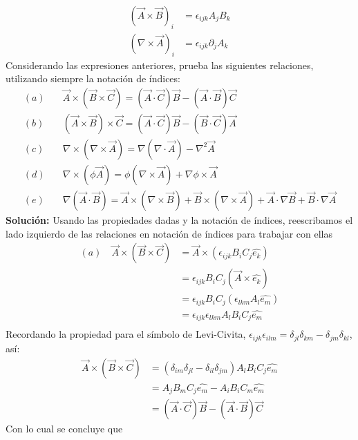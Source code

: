 \documentclass[11pt,letterpaper]{article}
\begin{document}
\begin{align}
    (\vec{A}\times\vec{B})_i &  =\epsilon_{ijk}A_jB_k \\ 
    (\nabla \times \vec{A})_i & = \epsilon_{ijk}\partial_jA_k
\end{align}
Considerando las expresiones anteriores, prueba las siguientes relaciones, utilizando siempre la notación de índices:
\begin{align}
    (a)  &\quad \vec{A}\times (\vec{B}\times\vec{C})  = (\vec{A}\cdot \vec{C}) \vec{B} - (\vec{A}\cdot\vec{B})\vec{C} \\
    (b) &\quad (\vec{A}\times\vec{B}) \times \vec{C}  = (\vec{A}\cdot \vec{C})\vec{B} - (\vec{B}\cdot\vec{C}) \vec{A} \\
    (c) &\quad \nabla \times (\nabla \times \vec{A})  = \nabla (\nabla \cdot \vec{A}) - \nabla^2 \vec{A} \\
    (d) &\quad \nabla \times (\phi\vec{A})  = \phi (\nabla \times \vec{A}) + \nabla \phi \times \vec{A} \\
    (e) &\quad \nabla (\vec{A}\cdot\vec{B})   = \vec{A}\times(\nabla\times\vec{B}) + \vec{B} \times (\nabla \times\vec{A}) + \vec{A}\cdot\nabla\vec{B} + \vec{B} \cdot\nabla\vec{A}
\end{align}
\textbf{Solución:} Usando las propiedades dadas y la notación de índices, reescribamos el lado izquierdo de las relaciones en notación de índices para trabajar con ellas
\begin{align*}
    (a)  \quad \vec{A}\times (\vec{B}\times\vec{C})   & = \vec{A}\times (\epsilon_{ijk}B_iC_j \hat{e_k}) \\
    & = \epsilon_{ijk}B_iC_j (\vec{A}\times \hat{e_k}) \\
    & = \epsilon_{ijk}B_iC_j (\epsilon_{lkm} A_l \hat{e_m}) \\
    & = \epsilon_{ijk}\epsilon_{lkm} A_lB_iC_j\hat{e_m} \\
\end{align*}
Recordando la propiedad para el símbolo de Levi-Civita, $\epsilon_{ijk}\epsilon_{ilm} = \delta_{jl}\delta_{km}-\delta_{jm} \delta_{kl}$, así:
\begin{align*}
    \vec{A}\times (\vec{B}\times\vec{C})   & = (\delta_{im}\delta_{jl} - \delta_{il}\delta_{jm}) A_lB_iC_j\hat{e_m} \\
    & = A_jB_m C_j \hat{e_m} - A_iB_iC_m\hat{e_m} \\
    & = (\vec{A}\cdot\vec{C})\vec{B} - (\vec{A}\cdot\vec{B})\vec{C}
\end{align*}
Con lo cual se concluye que
\end{document}
